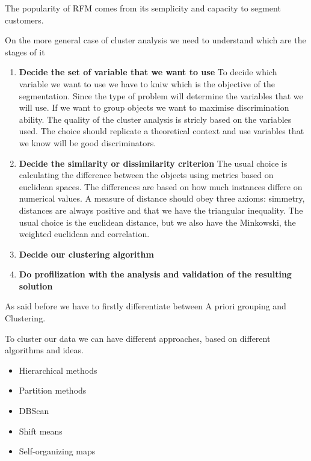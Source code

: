 The popularity of RFM comes from its semplicity and capacity to segment customers.

\vspace{10pt}

On the more general case of cluster analysis we need to understand which are the stages of it

\begin{enumerate}
    \item \textbf{Decide the set of variable that we want to use} \ra 
To decide which variable we want to use we have to kniw which is the objective of the segmentation. Since
the type of problem will determine the variables that we will use. If we want to group objects we want to maximise discrimination ability.
The quality of the cluster analysis is stricly based on the variables used. The choice should replicate a theoretical context and use variables that we know will be good discriminators.

    \item \textbf{Decide the similarity or dissimilarity criterion} \ra The usual choice is calculating the difference between the objects using metrics based on euclidean spaces. The differences are based on how much instances differe on numerical values. A measure of distance should obey three axioms: simmetry, distances are always positive and that we have the triangular inequality. The usual choice is the euclidean distance, but we also have the Minkowski, the weighted euclidean and correlation.
    
    \item \textbf{Decide our clustering algorithm}
    
    \item \textbf{Do profilization with the analysis and validation of the resulting solution}
\end{enumerate}

As said before we have to firstly differentiate between A priori grouping and Clustering.

\vspace{10pt}

To cluster our data we can have different approaches, based on different algorithms and ideas. 
\begin{itemize}
    \item Hierarchical methods
    \item Partition methods
    \item DBScan
    \item Shift means
    \item Self-organizing maps
\end{itemize}

